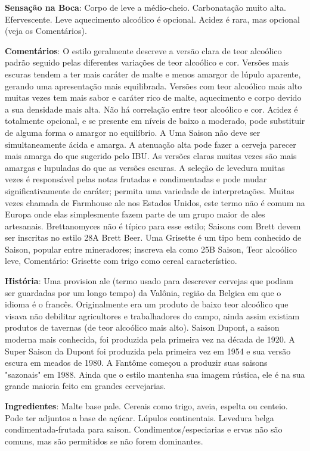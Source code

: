 \textbf{Sensação na Boca}: Corpo de leve a médio-cheio. Carbonatação muito alta. Efervescente. Leve aquecimento alcoólico é opcional. Acidez é rara, mas opcional (veja os Comentários).

\textbf{Comentários}: O estilo geralmente descreve a versão clara de teor alcoólico padrão seguido pelas diferentes variações de teor alcoólico e cor. Versões mais escuras tendem a ter mais caráter de malte e menos amargor de lúpulo aparente, gerando uma apresentação mais equilibrada. Versões com teor alcoólico mais alto muitas vezes tem mais sabor e caráter rico de malte, aquecimento e corpo devido a sua densidade mais alta. Não há correlação entre teor alcoólico e cor.
Acidez é totalmente opcional, e se presente em níveis de baixo a moderado, pode substituir de alguma forma o amargor no equilíbrio. A Uma Saison não deve ser simultaneamente ácida e amarga. A atenuação alta pode fazer a cerveja parecer mais amarga do que sugerido pelo IBU. As versões claras muitas vezes são mais amargas e lupuladas do que as versões escuras. A seleção de levedura muitas vezes é responsável pelas notas frutadas e condimentadas e pode mudar significativamente de caráter; permita uma variedade de interpretações.
Muitas vezes chamada de Farmhouse ale nos Estados Unidos, este termo não é comum na Europa onde elas simplesmente fazem parte de um grupo maior de ales artesanais. Brettanomyces não é típico para esse estilo; Saisons com Brett devem ser inscritas no estilo 28A Brett Beer. Uma Grisette é um tipo bem conhecido de Saison, popular entre mineradores; inscreva ela como 25B Saison, Teor alcoólico leve, Comentário: Grisette com trigo como cereal característico.

\textbf{História}: Uma provision ale (termo usado para descrever cervejas que podiam ser guardadas por um longo tempo) da Valônia, região da Belgica em que o idioma é o francês. Originalmente era um produto de baixo teor alcoólico que visava não debilitar agricultores e trabalhadores do campo, ainda assim existiam produtos de tavernas (de teor alcoólico mais alto). Saison Dupont, a saison moderna mais conhecida, foi produzida pela primeira vez na década de 1920. A Super Saison da Dupont foi produzida pela primeira vez em 1954 e sua versão escura em meados de 1980. A Fantôme começou a produzir suas saisons "sazonais" em 1988. Ainda que o estilo mantenha sua imagem rústica, ele é na sua grande maioria feito em grandes cervejarias.

\textbf{Ingredientes}: Malte base pale. Cereais como trigo, aveia, espelta ou centeio. Pode ter adjuntos a base de açúcar. Lúpulos continentais. Levedura belga condimentada-frutada para saison. Condimentos/especiarias e ervas não são comuns, mas são permitidos se não forem dominantes.

